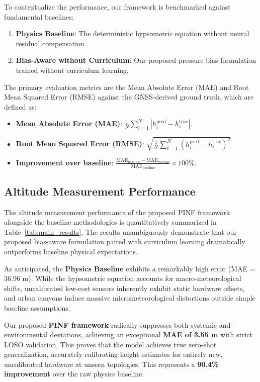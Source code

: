 To contextualize the performance, our framework is benchmarked against fundamental baselines:
\begin{enumerate}
    \item \textbf{Physics Baseline}: The deterministic hypsometric equation without neural residual compensation.
    \item \textbf{Bias-Aware without Curriculum}: Our proposed pressure bias formulation trained without curriculum learning.
\end{enumerate}

The primary evaluation metrics are the Mean Absolute Error (MAE) and Root Mean Squared Error (RMSE) against the GNSS-derived ground truth, which are defined as:
\begin{itemize}
    \item \textbf{Mean Absolute Error (MAE)}: $\frac{1}{N} \sum_{i=1}^N |h_i^{\text{pred}} - h_i^{\text{true}}|$.
    \item \textbf{Root Mean Squared Error (RMSE)}: $\sqrt{\frac{1}{N} \sum_{i=1}^N (h_i^{\text{pred}} - h_i^{\text{true}})^2}$.
    \item \textbf{Improvement over baseline}: $\frac{\text{MAE}_{\text{baseline}} - \text{MAE}_{\text{method}}}{\text{MAE}_{\text{baseline}}} \times 100\%$.
\end{itemize}

\subsection{Altitude Measurement Performance}
\label{subsec:main_results}

The altitude measurement performance of the proposed PINF framework alongside the baseline methodologies is quantitatively summarized in Table~\ref{tab:main_results}. The results unambiguously demonstrate that our proposed bias-aware formulation paired with curriculum learning dramatically outperforms baseline physical expectations.

As anticipated, the \textbf{Physics Baseline} exhibits a remarkably high error (MAE = 36.96 m). While the hypsometric equation accounts for macro-meteorological shifts, uncalibrated low-cost sensors inherently exhibit static hardware offsets, and urban canyons induce massive micrometeorological distortions outside simple baseline assumptions.

Our proposed \textbf{PINF framework} radically suppresses both systemic and environmental deviations, achieving an exceptional \textbf{MAE of 3.55 m} with strict LOSO validation. This proves that the model achieves true zero-shot generalization, accurately calibrating height estimates for entirely new, uncalibrated hardware at unseen topologies. This represents a \textbf{90.4\% improvement} over the raw physics baseline.

